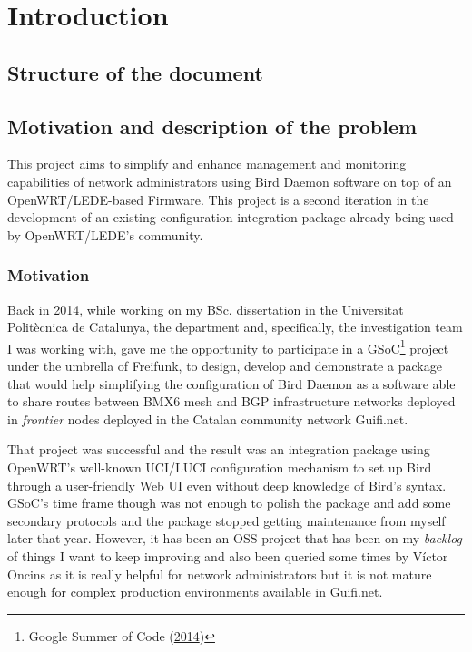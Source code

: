 \chapter{Introduction}
\label{ch:introduction}
\pagestyle{headings}

\section{Structure of the document}

\section{Motivation and description of the problem}
\label{sec:bdotp}
This project aims to simplify and enhance management and monitoring capabilities of network administrators using Bird Daemon software on top of an OpenWRT/LEDE-based Firmware. This project is a second iteration in the development of an existing configuration integration package already being used by OpenWRT/LEDE's community.

\subsection{Motivation}
\label{sec:motivation}
Back in 2014, while working on my BSc. dissertation in the Universitat Politècnica de Catalunya, the department and, specifically, the investigation team I was working with, gave me the opportunity to participate in a GSoC\footnote{Google Summer of Code (\href{https://www.google-melange.com/archive/gsoc/2014/orgs/freifunk/projects/eloicaso.html}{2014})} project under the umbrella of Freifunk, to design, develop and demonstrate a package that would help simplifying the configuration of Bird Daemon as a software able to share routes between BMX6 mesh and BGP infrastructure networks deployed in \textit{frontier} nodes deployed in the Catalan community network Guifi.net.

That project was successful and the result was an integration package using OpenWRT's well-known UCI/LUCI configuration mechanism to set up Bird through a user-friendly Web UI even without deep knowledge of Bird's syntax. GSoC's time frame though was not enough to polish the package and add some secondary protocols and the package stopped getting maintenance from myself later that year. However, it has been an OSS project that has been on my \textit{backlog} of things I want to keep improving and also been queried some times by Víctor Oncins as it is really helpful for network administrators but it is not mature enough for complex production environments available in Guifi.net.

